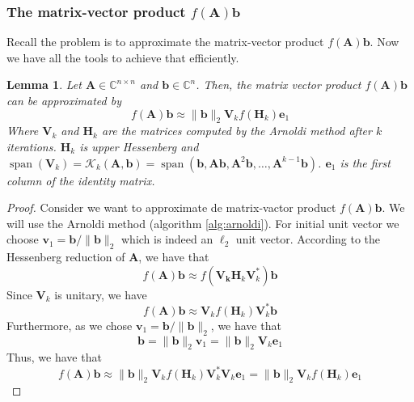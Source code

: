 \documentclass[11pt]{article}
\DeclareMathOperator{\spn}{span}
\newtheorem{lemma}{Lemma}[section]
\numberwithin{equation}{section}
\begin{document}
\subsubsection{The matrix-vector product $f(\mathbf{A})\mathbf{b}$}
Recall the problem is to approximate the matrix-vector product $f(\mathbf{A})\mathbf{b}$. Now we have all the tools to achieve that efficiently.  
\begin{lemma}\label{lem:arnoldi1}
    Let $\mathbf{A}\in\mathbb{C}^{n\times n}$ and $\mathbf{b}\in\mathbb{C}^n$. Then, the matrix vector product $f(\mathbf{A})\mathbf{b}$ can be approximated by
    \begin{equation}
        f(\mathbf{A})\mathbf{b} \approx \|\mathbf{b}\|_2\mathbf{V}_k f(\mathbf{H}_k)\mathbf{e}_1
    \end{equation}
    Where $\mathbf{V}_k$ and $\mathbf{H}_k$ are the matrices computed by the Arnoldi method after $k$ iterations. $\mathbf{H}_k$ is upper Hessenberg and $\spn{\left(\mathbf{V}_k\right)}=\mathcal{K}_k(\mathbf{A},\mathbf{b}) = \spn{\left(\mathbf{b}, \mathbf{A}\mathbf{b}, \mathbf{A}^2\mathbf{b}, \dots, \mathbf{A}^{k-1}\mathbf{b}\right)}$. $\mathbf{e}_1$ is the first column of the identity matrix.
\end{lemma}
\begin{proof}
    Consider we want to approximate de matrix-vactor product $f(\mathbf{A})\mathbf{b}$. We will use the Arnoldi method (algorithm \ref{alg:arnoldi}). For initial unit vector we choose $\mathbf{v}_1 = \mathbf{b}/\|\mathbf{b}\|_2$ which is indeed an $\ell_2$ unit vector. According to the Hessenberg reduction of $\mathbf{A}$, we have that
    \begin{equation*}
        f(\mathbf{A})\mathbf{b} \approx f(\mathbf{V_k}\mathbf{H}_k\mathbf{V}_k^*)\mathbf{b}
    \end{equation*}
    Since $\mathbf{V}_k$ is unitary, we have
    \begin{equation*}
        f(\mathbf{A})\mathbf{b} \approx \mathbf{V}_k f(\mathbf{H}_k)\mathbf{V}_k^*\mathbf{b}
    \end{equation*}
    Furthermore, as we chose $\mathbf{v}_1 = \mathbf{b}/\|\mathbf{b}\|_2$, we have that
    \begin{equation*}
        \mathbf{b} = \|\mathbf{b}\|_2\mathbf{v}_1 = \|\mathbf{b}\|_2\mathbf{V}_k\mathbf{e}_1
    \end{equation*}
    Thus, we have that
    \begin{equation*}
        f(\mathbf{A})\mathbf{b} \approx \|\mathbf{b}\|_2\mathbf{V}_k f(\mathbf{H}_k)\mathbf{V}_k^*\mathbf{V}_k\mathbf{e}_1 = \|\mathbf{b}\|_2\mathbf{V}_k f(\mathbf{H}_k)\mathbf{e}_1
    \end{equation*}
\end{proof}
\end{document}
